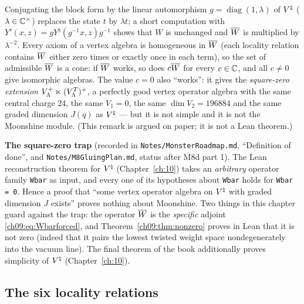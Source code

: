 \begin{remark}[Scaling, and why $\chnineWb=0$ is dangerous]\label{ch09:rem:scaling}
Conjugating the block form by the linear automorphism $g=\operatorname{diag}(1,\lambda)$ of
${V^{\natural}}$ ($\lambda\in{\mathbb{C}}^\times$) replaces the state $t$ by $\lambda t$; a short computation with
$Y'(x,z)=gY^\natural(g^{-1}x,z)g^{-1}$ shows that $W$ is unchanged and $\overline{W}$ is multiplied
by $\lambda^{-2}$. Every axiom of a vertex algebra is homogeneous in $\overline{W}$ (each locality
relation contains $\overline{W}$ either zero times or exactly once in each term), so the set of
admissible $\overline{W}$ is a cone: if $\overline{W}$ works, so does $c\overline{W}$ for every
$c\in{\mathbb{C}}$, and all $c\neq0$ give isomorphic algebras. The value $c=0$ also ``works'': it gives the
\emph{square-zero extension} $V_{\Lambda}^{+}\ltimes(V_{\Lambda}^{T})^{+}$, a perfectly good vertex operator algebra
with the same central charge $24$, the same $V_1=0$, the same $\dim V_2=196884$ and the same
graded dimension $J(q)$ as ${V^{\natural}}$ --- but it is not simple and it is not the Moonshine module.
(This remark is argued on paper; it is not a Lean theorem.)
\end{remark}

\begin{warning}
\textbf{The square-zero trap} (recorded in \texttt{Notes/MonsterRoadmap.md}, ``Definition of
done'', and \texttt{Notes/M8GluingPlan.md}, status after M8d part 1). The Lean reconstruction
theorem for ${V^{\natural}}$ (Chapter~\ref{ch:10}) takes an \emph{arbitrary} operator family
\texttt{Wbar} as input, and every one of its hypotheses about \texttt{Wbar} holds for
\texttt{Wbar = 0}. Hence a proof that ``some vertex operator algebra on ${V^{\natural}}$ with graded
dimension $J$ exists'' proves nothing about Moonshine. Two things in this chapter guard against
the trap: the operator $\overline{W}$ is the \emph{specific} adjoint \eqref{ch09:eq:Wbarforced},
and Theorem~\ref{ch09:thm:nonzero} proves in Lean that it is not zero (indeed that it pairs
the lowest twisted weight space nondegenerately into the vacuum line). The final theorem of the
book additionally proves simplicity of ${V^{\natural}}$ (Chapter~\ref{ch:10}).
\end{warning}

\subsection{The six locality relations}

